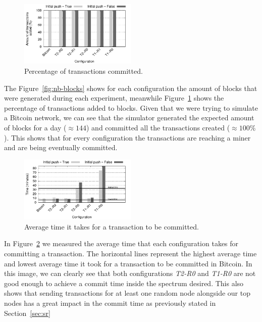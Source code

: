 \documentclass{dads}   %
\begin{document}
\begin{figure}
\centering
\includegraphics[width=0.5\textwidth]{plots/tx-added.pdf}
\caption{Percentage of transactions committed.}
\label{fig:tx-added}
\end{figure}

The Figure~\ref{fig:nb-blocks} shows for each configuration the amount of blocks that were generated during each experiment, meanwhile Figure~\ref{fig:tx-added} shows the percentage of transactions added to blocks. Given that we were trying to simulate a Bitcoin network, we can see that the simulator generated the expected amount of blocks for a day ($\approx 144$) and committed all the transactions created ($\approx 100\%$). This shows that for every configuration the transactions are reaching a miner and are being eventually committed.

\begin{figure}
\centering
\includegraphics[width=0.5\textwidth]{plots/commit-time.pdf}
\caption{Average time it takes for a transaction to be committed.}
\label{fig:commit-time}
\end{figure}

In Figure~\ref{fig:commit-time} we measured the average time that each configuration takes for committing a transaction. The horizontal lines represent the highest average time and lowest average time it took for a transaction to be committed in Bitcoin. In this image, we can clearly see that both configurations \textsl{T2-R0} and \textsl{T1-R0} are not good enough to achieve a commit time inside the spectrum desired. This also shows that sending transactions for at least one random node alongside our top nodes has a great impact in the commit time as previously stated in Section~\ref{sec:sr}
\end{document}
